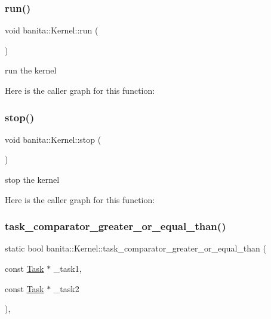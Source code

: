 \subsubsection{\texorpdfstring{run()}{run()}}
{\footnotesize\ttfamily void banita\+::\+Kernel\+::run (\begin{DoxyParamCaption}{ }\end{DoxyParamCaption})}



run the kernel 

Here is the caller graph for this function\+:
\mbox{\label{classbanita_1_1_kernel_aee9ff2e2d1816a4b3c1ef2694034e0ce}} 
\subsubsection{\texorpdfstring{stop()}{stop()}}
{\footnotesize\ttfamily void banita\+::\+Kernel\+::stop (\begin{DoxyParamCaption}{ }\end{DoxyParamCaption})\hspace{0.3cm}{\ttfamily [inline]}}



stop the kernel 

Here is the caller graph for this function\+:
\mbox{\label{classbanita_1_1_kernel_a4f86a08b65bb2dee12329ddb9ec127a9}} 
\subsubsection{\texorpdfstring{task\_comparator\_greater\_or\_equal\_than()}{task\_comparator\_greater\_or\_equal\_than()}}
{\footnotesize\ttfamily static bool banita\+::\+Kernel\+::task\+\_\+comparator\+\_\+greater\+\_\+or\+\_\+equal\+\_\+than (\begin{DoxyParamCaption}\item[{const \mbox{\hyperlink{classbanita_1_1_task}{Task}} $\ast$}]{\+\_\+task1,  }\item[{const \mbox{\hyperlink{classbanita_1_1_task}{Task}} $\ast$}]{\+\_\+task2 }\end{DoxyParamCaption})\hspace{0.3cm}{\ttfamily [inline]}, {\ttfamily [static]}}

